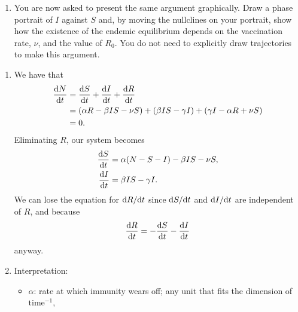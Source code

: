 \documentclass[a4paper,12pt]{article}
\begin{document}
\begin{enumerate}[label={\bf \arabic{*}.\;}, ref={\arabic{*}},itemsep=3ex, left=0ex]
{\begin{enumerate}
\begin{enumerate}[label=(\roman*)]
		\item Find the values of $S$ and $I$ at the two equilibria of the system.
		\item The disease is eradicated if the disease-free equilibrium is the only possible stable equilibrium and the endemic equilibrium does not exist. Perform a linear stability analysis on both equilibria of the system and show that the disease is eradicated if $R^*<1$, where you should define the constant $R^*$.
		\item Define $R_0$ as the value of $R^*$ in the absence of vaccination (i.e.\ when $\nu=0$): in this way, $R_0$ can be seen as an inherent property of the disease. Rearrange the statement $R^*<1$ to find the condition on the vaccination rate, $\nu$, for the disease to be eradicated in terms of $R_0$.
	\end{enumerate}
	\item You are now asked to present the same argument graphically. Draw a phase portrait of $I$ against $S$ and, by moving the nullclines on your portrait, show how the existence of the endemic equilibrium depends on the vaccination rate, $\nu$, and the value of $R_0$. You do not need to explicitly draw trajectories to make this argument.
\end{enumerate}
}
{
\begin{enumerate}
    \item %
    We have that
    \begin{align*}
        \fd{N}{t} &= \fd{S}{t} + \fd{I}{t} + \fd{R}{t}\\
        &= (\alpha R - \beta I S-\nu S) + (\beta I S - \gamma I) + (\gamma I - \alpha R + \nu S) \\
        &= 0.
    \end{align*}
    Eliminating $R$, our system becomes
    \begin{align*}
        \fd{S}{t} &= \alpha(N-S-I)-\beta IS-\nu S,\\
        \fd{I}{t} &= \beta IS - \gamma I.
    \end{align*}
    We can lose the equation for $\fd{R}{t}$ since $\fd{S}{t}$ and $\fd{I}{t}$ are independent of $R$, and because 
    \begin{equation*}
        \fd{R}{t} = -\fd{S}{t} - \fd{I}{t}
    \end{equation*}
    anyway.
    \item %
    Interpretation:
    \begin{itemize}
        \item $\alpha$: rate at which immunity wears off; any unit that fits the dimension of $\text{time}^{-1}$,

\end{itemize}
\end{enumerate}}
\end{enumerate}
\end{document}
